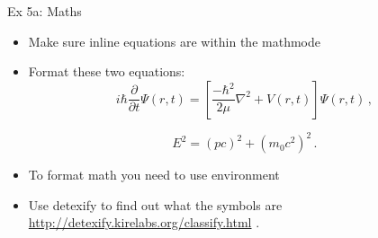 \documentclass[10pt, notes]{beamer}
\begin{document}
\begin{frame}{Ex 5a: Maths}

\begin{itemize}
\item Make sure inline equations are within the mathmode \cmmd{\$\dots\$}
\item Format these two equations:
\begin{equation*}
i \hbar \frac{\partial}{\partial t} \Psi(r,t) = 
\left[\frac{-\hbar^2}{2\mu}\nabla^2+V(r,t)\right]\Psi(r,t) \,,
\end{equation*}

\begin{equation*}
E^2 = (pc)^2 + (m_0 c^2)^2 \,.
\end{equation*}

\begin{center}
\end{center}
\item To format math you need to use  environment
\item Use detexify to find out what the symbols are 
\href{http://detexify.kirelabs.org/classify.html}{http://detexify.kirelabs.org/classify.html}
.
\end{itemize}

\end{frame}
\end{document}
